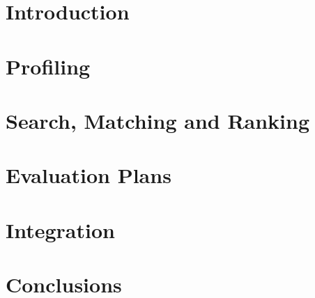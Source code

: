 \documentclass{SmartReport}
\newcommand{\todo}[1]{\noindent{\textcolor{red}{[TODO: #1]}}}
\begin{document}
\newpage


\section{Introduction}
\label{sec:intro}


\newpage


\section{Profiling}
\label{sec:profiling}


\section{Search, Matching and Ranking}
\label{sec:matching_ranking}


% 

\section{Evaluation Plans}
\label{sec:evaluation}


\section{Integration}
\label{sec:integration}


\section{Conclusions}
\label{sec:concl}

\newpage
\end{document}

